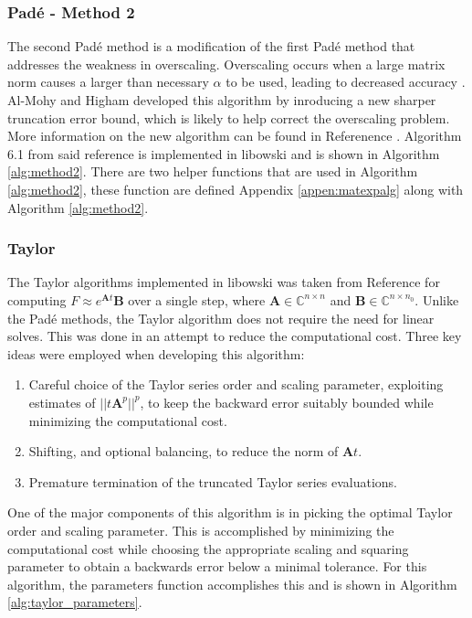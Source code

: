 \subsubsection{Pad\'e - Method 2}
The second Pad\'e method is a modification of the first Pad\'e method that addresses the weakness in overscaling. Overscaling occurs when a large matrix norm causes a larger than necessary $\alpha$ to be used, leading to decreased accuracy \cite{higham2009}. Al-Mohy and Higham developed this algorithm by inroducing a new sharper truncation error bound, which is likely to help correct the overscaling problem. More information on the new algorithm can be found in Referenence \cite{higham2009}. Algorithm 6.1 from said reference is implemented in libowski and is shown in Algorithm \ref{alg:method2}. There are two helper functions that are used in Algorithm \ref{alg:method2}, these function are defined Appendix \ref{appen:matexpalg} along with Algorithm \ref{alg:method2}. 


\subsubsection{Taylor}
The Taylor algorithms implemented in libowski was taken from Reference \cite{higham2011} for computing $F \approx e^{\boldsymbol{A}t}\boldsymbol{B}$ over a single step, where $\boldsymbol{A} \in \mathbb{C}^{n\times n}$ and $\boldsymbol{B} \in \mathbb{C}^{n\times n_{0}}$. Unlike the Pad\'e methods, the Taylor algorithm does not require the need for linear solves. This was done in an attempt to reduce the computational cost. Three key ideas were employed when developing this algorithm:

\begin{enumerate}
    \item Careful choice of the Taylor series order and scaling parameter, exploiting estimates of $||t{\boldsymbol{A}}^{p}||^{p}$, to keep the backward error suitably bounded while minimizing the computational cost.
    \item Shifting, and optional balancing, to reduce the norm of $\boldsymbol{A}t$.
    \item Premature termination of the truncated Taylor series evaluations.
\end{enumerate}


One of the major components of this algorithm is in picking the optimal Taylor order and scaling parameter. This is accomplished by minimizing the computational cost while choosing the appropriate scaling and squaring parameter to obtain a backwards error below a minimal tolerance. For this algorithm, the parameters function accomplishes this and is shown in Algorithm \ref{alg:taylor_parameters}. 





